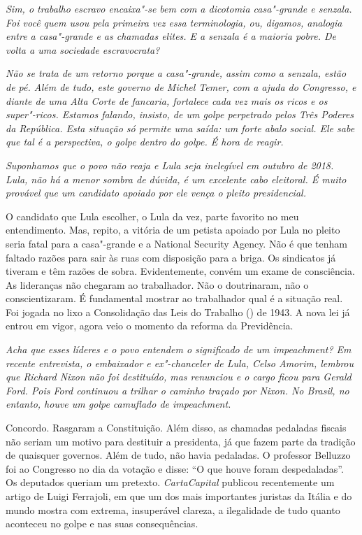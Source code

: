 \itshape
Sim, o trabalho escravo encaixa"-se bem com a dicotomia
casa"-grande e senzala. Foi você quem usou pela primeira vez essa
terminologia, ou, digamos, analogia entre a casa"-grande e as chamadas
elites. E a senzala é a maioria pobre. De volta a uma sociedade
escravocrata?

\normalfont 

\itshape
Não se trata de um retorno porque a casa"-grande, assim
como a senzala, estão de pé. Além de tudo, este governo de Michel Temer,
com a ajuda do Congresso, e diante de uma Alta Corte de fancaria,
fortalece cada vez mais os ricos e os super"-ricos. Estamos falando,
insisto, de um golpe perpetrado pelos Três Poderes da República. Esta
situação só permite uma saída: um forte abalo social. Ele sabe que tal é
a perspectiva, o golpe dentro do golpe. É hora de reagir.

\itshape
Suponhamos que o povo não reaja e Lula seja inelegível
em outubro de 2018. Lula, não há a menor sombra de dúvida, é um
excelente cabo eleitoral. É muito provável que um candidato apoiado por
ele vença o pleito presidencial.

\normalfont 
O candidato que Lula escolher, o Lula da vez, parte
favorito no meu entendimento. Mas, repito, a vitória de um petista
apoiado por Lula no pleito seria fatal para a casa"-grande e a National
Security Agency. Não é que tenham faltado razões para sair às ruas com
disposição para a briga. Os sindicatos já tiveram e têm razões de sobra.
Evidentemente, convém um exame de consciência. As lideranças não
chegaram ao trabalhador. Não o doutrinaram, não o conscientizaram. É
fundamental mostrar ao trabalhador qual é a situação real. Foi jogada no
lixo a Consolidação das Leis do Trabalho () de 1943. A nova lei já
entrou em vigor, agora veio o momento da reforma da Previdência.

\itshape
Acha que esses líderes e o povo entendem o significado
de um \emph{impeachment}? Em recente entrevista, o embaixador e
ex"-chanceler de Lula, Celso Amorim, lembrou que Richard Nixon não foi
destituído, mas renunciou e o cargo ficou para Gerald Ford. Pois Ford
continuou a trilhar o caminho traçado por Nixon. No Brasil, no entanto,
houve um golpe camuflado de \emph{impeachment}.

\normalfont 
Concordo. Rasgaram a Constituição. Além disso, as
chamadas pedaladas fiscais não seriam um motivo para destituir a
presidenta, já que fazem parte da tradição de quaisquer governos. Além
de tudo, não havia pedaladas. O professor Belluzzo foi ao Congresso no
dia da votação e disse: ``O que houve foram despedaladas''. Os deputados
queriam um pretexto. \emph{CartaCapital} publicou recentemente um artigo
de Luigi Ferrajoli, em que um dos mais importantes juristas da Itália e
do mundo mostra com extrema, insuperável clareza, a ilegalidade de tudo
quanto aconteceu no golpe e nas suas consequências.

